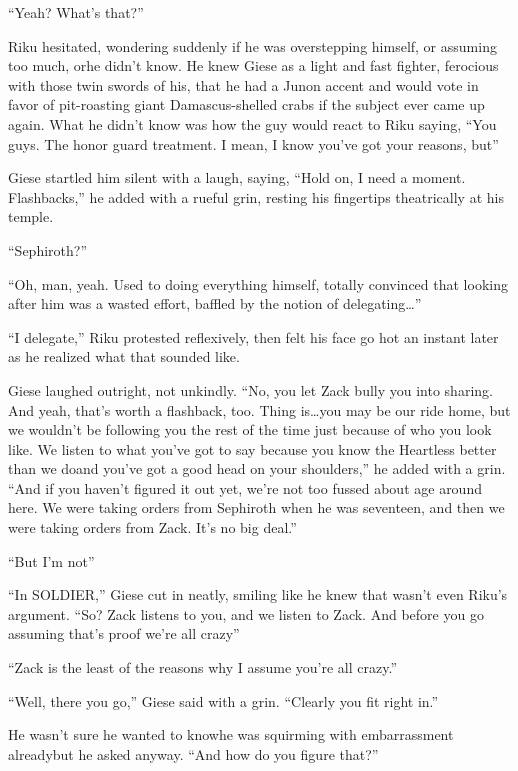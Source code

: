 ``Yeah? What's that?''

Riku hesitated, wondering suddenly if he was overstepping himself, or assuming too much, or\textemdash he didn't know. He knew Giese as a light and fast fighter, ferocious with those twin swords of his, that he had a Junon accent and would vote in favor of pit-roasting giant Damascus-shelled crabs if the subject ever came up again. What he didn't know was how the guy would react to Riku saying, ``You guys. The honor guard treatment. I mean, I know you've got your reasons, but\textemdash ''

Giese startled him silent with a laugh, saying, ``Hold on, I need a moment. Flashbacks,'' he added with a rueful grin, resting his fingertips theatrically at his temple.

``Sephiroth?''

``Oh, man, yeah. Used to doing everything himself, totally convinced that looking after him was a wasted effort, baffled by the notion of delegating\ldots ''

``I delegate,'' Riku protested reflexively, then felt his face go hot an instant later as he realized what that sounded like.

Giese laughed outright, not unkindly. ``No, you let Zack bully you into sharing. And yeah, that's worth a flashback, too. Thing is\ldots you may be our ride home, but we wouldn't be following you the rest of the time just because of who you look like. We listen to what you've got to say because you know the Heartless better than we do\textemdash and you've got a good head on your shoulders,'' he added with a grin. ``And if you haven't figured it out yet, we're not too fussed about age around here. We were taking orders from Sephiroth when he was seventeen, and then we were taking orders from Zack. It's no big deal.''

``But I'm not\textemdash ''

``In SOLDIER,'' Giese cut in neatly, smiling like he knew that wasn't even Riku's argument. ``So? Zack listens to you, and we listen to Zack. And before you go assuming that's proof we're all crazy\textemdash ''

``Zack is the least of the reasons why I assume you're all crazy.''

``Well, there you go,'' Giese said with a grin. ``Clearly you fit right in.''

He wasn't sure he wanted to know\textemdash he was squirming with embarrassment already\textemdash but he asked anyway. ``And how do you figure that?''

